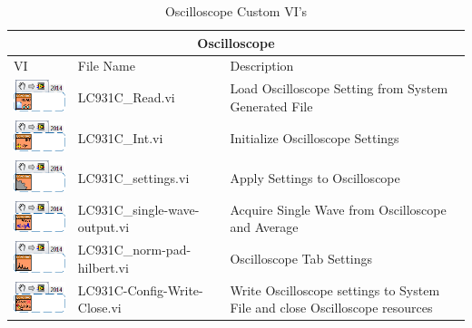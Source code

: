 \documentclass[11pt,a4paper,oldfontcommands]{memoir}
\begin{document}
\begin{table}
	\centering
	\begin{tabular}{ m{2.5cm} | m{5cm} | m{5cm} }
		\hline
		\hline \multicolumn{3}{c}{Oscilloscope} \\ \hline \hline
		VI & File Name & Description \\ \hline
		\includegraphics[scale=0.625]{LC931C_Read_main} & LC931C\_Read.vi & Load Oscilloscope Setting from System Generated File \\ \hline
		\includegraphics[scale=0.625]{LC931C_Int_main_02} & LC931C\_Int.vi & Initialize Oscilloscope Settings \\ \hline
		\includegraphics[scale=0.625]{LC931C_settings_main_01} & LC931C\_settings.vi & Apply Settings to Oscilloscope \\ \hline
		\includegraphics[scale=0.625]{LC931C_single-wave-output_main_01} & LC931C\_single-wave-output.vi & Acquire Single Wave from Oscilloscope and Average \\ \hline
		\includegraphics[scale=0.625]{LC931C_norm-pad-hilbert_main_01} & LC931C\_norm-pad-hilbert.vi & Oscilloscope Tab Settings \\ \hline
		\includegraphics[scale=0.625]{LC931C-Config-Write-Close_main_01} & LC931C-Config-Write-Close.vi & Write Oscilloscope settings to System File and close Oscilloscope resources \\ \hline
	\end{tabular}
	\caption{Oscilloscope Custom VI's}
	\label{tab:osc}
\end{table}
\end{document}
